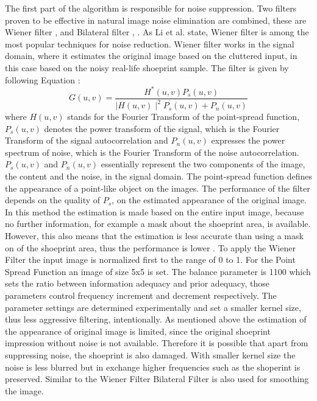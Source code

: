 \documentclass[draft,final]{vutinfth} %
\begin{document}
\par
The first part of the algorithm is responsible for noise suppression.
Two filters proven to be effective in natural image noise elimination are combined, these are Wiener filter \cite{li2014rapid}, \cite{chatterjee2011patch} and Bilateral filter \cite{zhang2016simultaneous}, \cite{huang2013self}.
As Li et al. \cite{li2014rapid} state, Wiener filter is among the most popular techniques for noise reduction.
Wiener filter works in the signal domain, where it estimates the original image based on the cluttered input, in this case based on the noisy real-life shoeprint sample. 
The filter is given by following Equation \cite{Win}:
\[ G(u, v) = \frac{H^*(u,v) P_s(u, v)}{\mid H(u,v)\mid ^2 P_s (u, v) + P_n (u, v)}  \]
where $H(u,v)$ stands for the Fourier Transform of the point-spread function, $P_s (u,v)$ denotes the power transform of the signal, which is the Fourier Transform of the signal autocorrelation and $P_n(u,v)$ expresses the power spectrum of noise, which is the Fourier Transform of the noise autocorrelation.
 $P_s(u,v)$ and  $P_n(u,v)$ essentially represent the two components of the image, the content and the noise, in the signal domain.
The point-spread function defines the appearance of a point-like object on the images.
The performance of the filter depends on the quality of $P_s$, on the estimated appearance of the original image.
In this method the estimation is made based on the entire input image, because no further information, for example a mask about the shoeprint  area, is available.
However, this also means that the estimation is less accurate than using a mask on of the shoeprint area, thus the performance is lower \cite{chatterjee2011patch}.
To apply the Wiener Filter the input image is normalized first to the range of 0 to 1.
For the Point Spread Function an image of size 5x5 is set.
The balance parameter is 1100 which sets the ratio between information adequacy and prior adequacy, those parameters control frequency increment and decrement respectively.
The parameter settings are determined experimentally and set a smaller kernel size, thus less aggressive filtering, intentionally.
As mentioned above the estimation of the appearance of original image is limited, since the original shoeprint impression without noise is not available.
Therefore it is possible that apart from suppressing noise, the shoeprint is also damaged.
With smaller kernel size the noise is less blurred but in exchange higher frequencies such as the shoperint is preserved.
Similar to the Wiener Filter Bilateral Filter is also used for smoothing the image.
\end{document}
